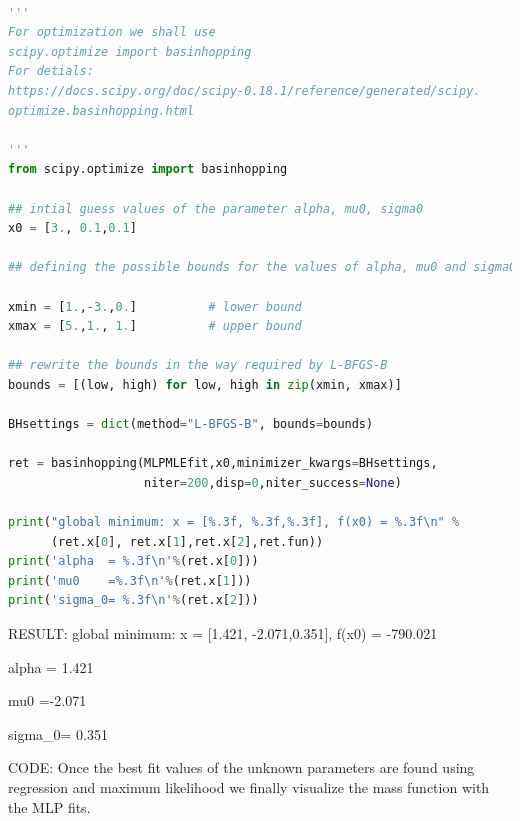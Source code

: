 \documentclass{article}
\begin{document}
\begin{lstlisting}[language=Python, caption=Python example]

'''
For optimization we shall use
scipy.optimize import basinhopping
For detials: 
https://docs.scipy.org/doc/scipy-0.18.1/reference/generated/scipy.
optimize.basinhopping.html

'''
from scipy.optimize import basinhopping

## intial guess values of the parameter alpha, mu0, sigma0
x0 = [3., 0.1,0.1]

## defining the possible bounds for the values of alpha, mu0 and sigma0

xmin = [1.,-3.,0.]          # lower bound
xmax = [5.,1., 1.]          # upper bound

## rewrite the bounds in the way required by L-BFGS-B
bounds = [(low, high) for low, high in zip(xmin, xmax)]

BHsettings = dict(method="L-BFGS-B", bounds=bounds)

ret = basinhopping(MLPMLEfit,x0,minimizer_kwargs=BHsettings,
                   niter=200,disp=0,niter_success=None)

print("global minimum: x = [%.3f, %.3f,%.3f], f(x0) = %.3f\n" % 
      (ret.x[0], ret.x[1],ret.x[2],ret.fun))
print('alpha  = %.3f\n'%(ret.x[0]))
print('mu0    =%.3f\n'%(ret.x[1]))
print('sigma_0= %.3f\n'%(ret.x[2]))
\end{lstlisting}

RESULT: global minimum: x = [1.421, -2.071,0.351], f(x0) = -790.021

alpha  = 1.421

mu0    =-2.071

sigma_0= 0.351

CODE: Once the best fit values of the unknown parameters are found using regression and maximum likelihood we finally visualize the mass function with the MLP fits. 
\end{document}
